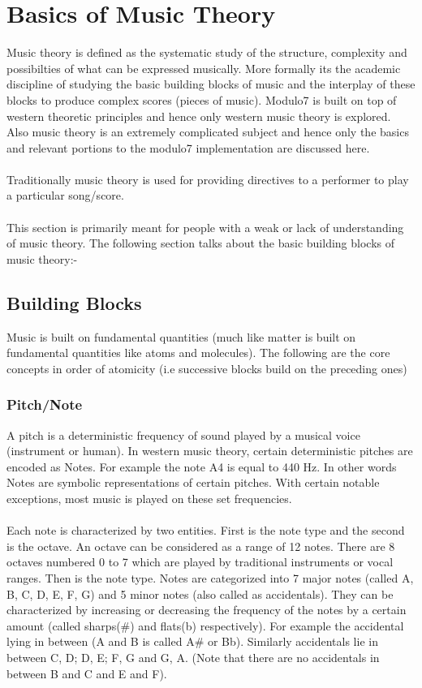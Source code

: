 \chapter{Basics of Music Theory}
\label{sec:intro}

\noindent Music theory is defined as the systematic study of the structure, complexity and possibilties of what can be expressed musically. More formally its the academic discipline of studying the basic building blocks of music and the interplay of these blocks to produce complex scores (pieces of music). Modulo7 is built on top of western theoretic principles and hence only western music theory is explored. Also music theory is an extremely complicated subject and hence only the basics and relevant portions to the modulo7 implementation are discussed here. \\\\
Traditionally music theory is used for providing directives to a performer to play a particular song/score. \\\\
This section is primarily meant for people with a weak or lack of understanding of music theory. 
The following section talks about the basic building blocks of music theory:-
\section{Building Blocks}

\noindent Music is built on fundamental quantities (much like matter is built on fundamental quantities like atoms and molecules). The following are the core concepts in order of atomicity (i.e successive blocks build on the preceding ones)

\subsection{Pitch/Note}

\noindent A pitch is a deterministic frequency of sound played by a musical voice (instrument or human). In western music theory, certain deterministic pitches are encoded as Notes. For example the note A4 is equal to 440 Hz. In other words Notes are symbolic representations of certain pitches. With certain notable exceptions, most music is played on these set frequencies. \\\\
Each note is characterized by two entities. First is the note type and the second is the octave. An octave can be considered as a range of 12 notes. There are 8 octaves numbered 0 to 7 which are played by traditional instruments or vocal ranges. Then is the note type. Notes are categorized into 7 major notes (called A, B, C, D, E, F, G) and 5 minor notes (also called as accidentals). They can be characterized by increasing or decreasing the frequency of the notes by a certain amount (called sharps(\#) and flats(b) respectively). For example the accidental lying in between (A and B is called A\# or Bb). Similarly accidentals lie in between C, D; D, E; F, G and G, A. (Note that there are no accidentals in between B and C and E and F).

